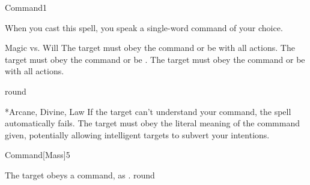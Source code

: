 \begin{spellsection}{Command}{1}
\begin{spellheader}
\end{spellheader}
\begin{spellcontent}
    \begin{spelltargetinginfo}
    \end{spelltargetinginfo}
    \begin{spelleffects}
        \spellspecial When you cast this spell, you speak a single-word command of your choice.
        \begin{spellattack}{Magic vs. Will}
            \spellsuccess The target must obey the command or be \severelyimpaired with all actions.
            \spellcritical The target must obey the command or be \stunned.
            \spellfailure The target must obey the command or be \impaired with all actions.
        \end{spellattack}
         round
    \end{spelleffects}
\end{spellcontent}
\begin{spellfooter}
    *{Arcane, Divine, Law}
    \spellnotes If the target can't understand your command, the spell automatically fails. The target must obey the literal meaning of the commmand given, potentially allowing intelligent targets to subvert your intentions.
\end{spellfooter}
\end{spellsection}

\begin{spellsection}{Command}[Mass]{5}
\begin{spellheader}
\end{spellheader}
\begin{spellcontent}
    \begin{spelltargetinginfo}
    \end{spelltargetinginfo}
    \begin{spelleffects}
        \spellsuccess The target obeys a command, as .
         round
    \end{spelleffects}
\end{spellcontent}
\begin{spellfooter}
\end{spellfooter}
\end{spellsection}

